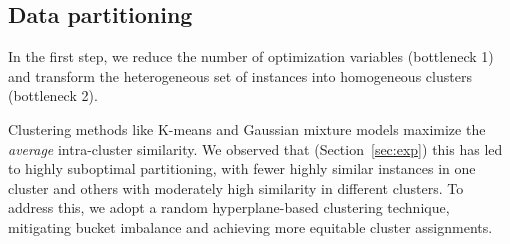 \documentclass[letterpaper]{article}
\begin{document}
\subsection{Data partitioning}
In the first step, we reduce the number of optimization variables (bottleneck 1) and transform the heterogeneous set of instances into homogeneous clusters (bottleneck 2). 

Clustering methods like K-means and Gaussian mixture models maximize the \emph{average} intra-cluster similarity. We observed that (Section~\ref{sec:exp}) this has led to highly suboptimal partitioning, with fewer highly similar instances in one cluster and others with moderately high similarity in different clusters. To address this, we adopt a random hyperplane-based clustering technique, mitigating bucket imbalance and achieving more equitable cluster assignments. 




 
\end{document}
